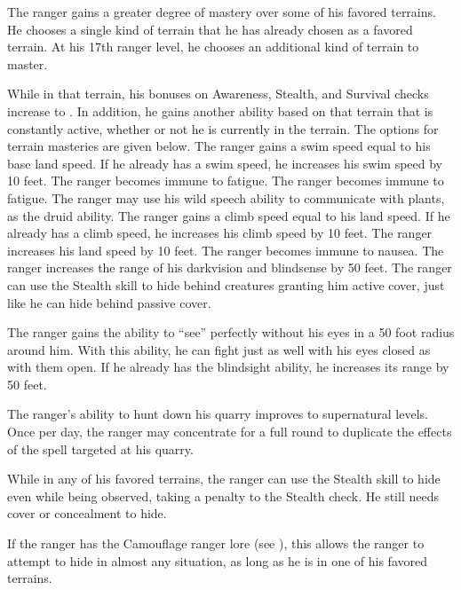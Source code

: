 The ranger gains a greater degree of mastery over some of his favored terrains.
He chooses a single kind of terrain that he has already chosen as a favored terrain.
At his 17th ranger level, he chooses an additional kind of terrain to master.
\par While in that terrain, his bonuses on Awareness, Stealth, and Survival checks increase to .
In addition, he gains another ability based on that terrain that is constantly active, whether or not he is currently in the terrain.
The options for terrain masteries are given below.
The ranger gains a swim speed equal to his base land speed.
If he already has a swim speed, he increases his swim speed by 10 feet.
The ranger becomes immune to fatigue.
The ranger becomes immune to fatigue.
The ranger may use his wild speech ability to communicate with plants, as the druid ability.
The ranger gains a climb speed equal to his land speed.
If he already has a climb speed, he increases his climb speed by 10 feet.
The ranger increases his land speed by 10 feet.
The ranger becomes immune to nausea.
The ranger increases the range of his darkvision and blindsense by 50 feet.
The ranger can use the Stealth skill to hide behind creatures granting him active cover, just like he can hide behind passive cover.


The ranger gains the ability to ``see'' perfectly without his eyes in a 50 foot radius around him.
With this ability, he can fight just as well with his eyes closed as with them open.
If he already has the blindsight ability, he increases its range by 50 feet.

The ranger's ability to hunt down his quarry improves to supernatural levels.
Once per day, the ranger may concentrate for a full round to duplicate the effects of the  spell targeted at his quarry.

While in any of his favored terrains, the ranger can use the Stealth skill to hide even while being observed, taking a  penalty to the Stealth check.
He still needs cover or concealment to hide.

If the ranger has the Camouflage ranger lore (see ), this allows the ranger to attempt to hide in almost any situation, as long as he is in one of his favored terrains.

